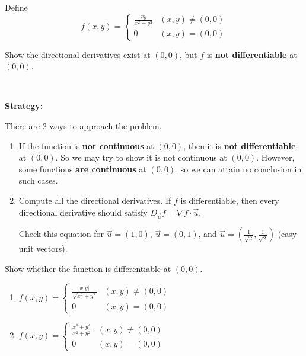 \documentclass[11pt,fleqn]{book} %
\begin{document}
\begin{exercise}
    Define $$f(x, y) = \begin{cases}
        \frac{xy}{x^2 + y^2} & (x, y) \neq (0, 0) \\
        0                    & (x, y) = (0, 0)
    \end{cases}$$

    Show the directional derivatives exist at $(0, 0)$, but $f$ is \textbf{not differentiable} at $(0, 0)$.

    {~~~}

    \textbf{Strategy:}
    
    There are 2 ways to approach the problem.

    \begin{enumerate}
        \item If the function is \textbf{not continuous} at $(0, 0)$, then it is \textbf{not differentiable} at $(0, 0)$. So we may try to show it is not continuous at $(0, 0)$. However, some functions \textbf{are continuous} at $(0, 0)$, so we can attain no conclusion in such cases.

        \item Compute all the directional derivatives. If $f$ is differentiable, then every directional derivative should satisfy $D_{\vec{u}} f = \nabla f \cdot \vec{u}$. 
        
        Check this equation for $\vec{u} = (1, 0)$, $\vec{u} = (0, 1)$, and $\vec{u} = \left( \frac{1}{\sqrt{2}}, \frac{1}{\sqrt{2}} \right)$ (easy unit vectors). 
    \end{enumerate}
\end{exercise}

\begin{exercise}
    Show whether the function is differentiable at $(0, 0)$.

    \begin{enumerate}[label=\alph*)]
        \item $f(x, y) = \begin{cases}
            \frac{x|y|}{\sqrt{x^2 + y^2}} & (x, y) \neq (0, 0) \\
            0                             & (x, y) = (0, 0)
        \end{cases}$

        \item $f(x, y) = \begin{cases}
            \frac{x^4 + y^4}{x^2 + y^2} & (x, y) \neq (0, 0) \\
            0                           & (x, y) = (0, 0)
        \end{cases}$
    \end{enumerate}
\end{exercise}
\end{document}
